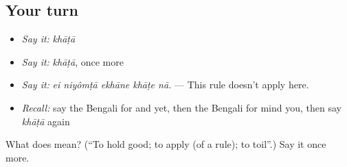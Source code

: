 \subsection*{Your turn}
\begin{itemize}
\raggedright
  \item \emph{Say it:} \emph{khāṭā}
  \item \emph{Say it:} \emph{khāṭā}, once more
  \item \emph{Say it:} \emph{ei niyômṭā ekhāne khāṭe nā.} — This rule doesn't apply here.
  \item \emph{Recall:} say the Bengali for and yet, then the Bengali for mind you, then say \emph{khāṭā} again
\end{itemize}

\begin{tcolorbox}[breakable,colback=teal!4,colframe=teal!35!black,title={Before you move on}]
What does  mean? (\textquotedblleft{}To hold good; to apply (of a rule); to toil\textquotedblright{}.) Say it once more.
\end{tcolorbox}
